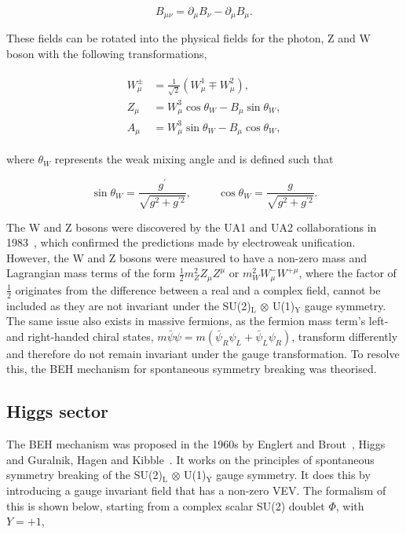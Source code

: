 \begin{equation}
B_{\mu\nu} = \partial_{\mu} B_{\nu} - \partial_{\mu} B_{\mu}.
\end{equation}

These fields can be rotated into the physical fields for the photon, Z and W boson with the following transformations,

\begin{align}
\begin{split}
W^{\pm}_{\mu} &= \frac{1}{\sqrt{2}}(W^{1}_{\mu} \mp W^{2}_{\mu}), \\
Z_{\mu} &= W^{3}_{\mu} \cos\theta_{W} - B_{\mu} \sin\theta_W, \\
A_{\mu} &= W^{3}_{\mu} \sin\theta_{W} - B_{\mu} \cos\theta_W,
\end{split}
\label{eqn:rotations}
\end{align}

where $\theta_W$ represents the weak mixing angle and is defined such that

\begin{equation}
\sin\theta_W = \frac{g^{\prime}}{\sqrt{g^2 + g^{\prime 2}}}, \hspace{1cm} \cos\theta_W = \frac{g}{\sqrt{g^2 + g^{\prime 2}}}.
\end{equation}

The W and Z bosons were discovered by the UA1 and UA2 collaborations in 1983~\cite{UA1:1983crd,UA2:1983tsx}, which confirmed the predictions made by electroweak unification.
However, the W and Z bosons were measured to have a non-zero mass and Lagrangian mass terms of the form $\frac{1}{2}m_{Z}^2 Z_{\mu} Z^{\mu}$ or $m_{W}^2 W_{\mu}^{-}W^{+\mu}$, where the factor of $\frac{1}{2}$ originates from the difference between a real and a complex field, cannot be included as they are not invariant under the SU(2)$_{\text{L}}$ $\otimes$ U(1)$_{\text{Y}}$ gauge symmetry.
The same issue also exists in massive fermions, as the fermion mass term's left- and right-handed chiral states, $m\bar{\psi}\psi = m(\bar{\psi}_R \psi_L + \bar{\psi}_L \psi_R)$,  transform differently and therefore do not remain invariant under the gauge transformation.
To resolve this, the \ac{BEH} mechanism for spontaneous symmetry breaking was theorised.

\subsection{Higgs sector}

The \ac{BEH} mechanism was proposed in the 1960s by Englert and Brout~\cite{Englert:1964et}, Higgs~\cite{Higgs:1964ia,Higgs:1964pj,Higgs:1966ev} and Guralnik, Hagen and Kibble~\cite{Guralnik:1964eu,Kibble:1967sv}.
It works on the principles of spontaneous symmetry breaking of the SU(2)$_{\text{L}}$ $\otimes$ U(1)$_{\text{Y}}$ gauge symmetry.
It does this by introducing a gauge invariant field that has a non-zero \ac{VEV}.
The formalism of this is shown below, starting from a complex scalar SU(2) doublet $\Phi$, with $Y=+1$, 

